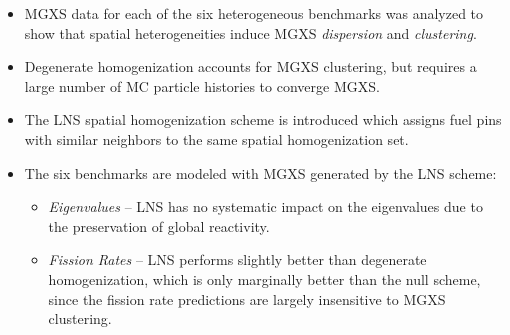 
\clearpage

\vfill
\begin{highlightsbox}[frametitle=Highlights]
\begin{itemize}
  \item \ac{MGXS} data for each of the six heterogeneous benchmarks was analyzed to show that spatial heterogeneities induce \ac{MGXS} \textit{dispersion} and \textit{clustering}.
  \item Degenerate homogenization accounts for \ac{MGXS} clustering, but requires a large number of \ac{MC} particle histories to converge \ac{MGXS}.
  \item The \ac{LNS} spatial homogenization scheme is introduced which assigns fuel pins with similar neighbors to the same spatial homogenization set.
  \item The six benchmarks are modeled with \ac{MGXS} generated by the \ac{LNS} scheme:
  \begin{itemize}
    \item \textit{Eigenvalues} -- \ac{LNS} has no systematic impact on the eigenvalues due to the preservation of global reactivity.
    \item \textit{Fission Rates} -- \ac{LNS} performs slightly better than degenerate homogenization, which is only marginally better than the null scheme, since the fission rate predictions are largely insensitive to \ac{MGXS} clustering.

\end{itemize}
\end{itemize}
\end{highlightsbox}
